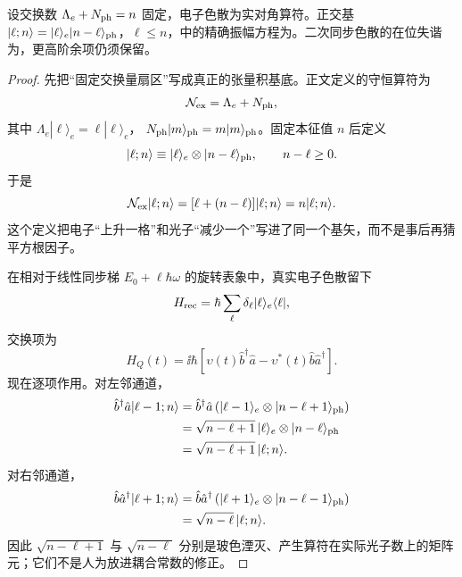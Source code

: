 \begin{proposition}[交换守恒扇区中的反冲格]
设交换数 $\Lambda_e+N_{\rm ph}=n$ 固定，电子色散为实对角算符。正交基 $|\ell;n\rangle=|\ell\rangle_e|n-\ell\rangle_{\rm ph}$，$\ell\le n$，中的精确振幅方程为。二次同步色散的在位失谐为，更高阶余项仍须保留。
\end{proposition}
\begin{proof}
先把“固定交换量扇区”写成真正的张量积基底。正文定义的守恒算符为
\begin{equation*}
\mathcal N_{\rm ex}=\Lambda_e+N_{\rm ph},
\end{equation*}
其中 \(\Lambda_e|\ell\rangle_e=\ell|\ell\rangle_e\)，
\(N_{\rm ph}|m\rangle_{\rm ph}=m|m\rangle_{\rm ph}\)。固定本征值 \(n\) 后定义
\begin{equation*}
|\ell;n\rangle
\equiv
|\ell\rangle_e\otimes|n-\ell\rangle_{\rm ph},
\qquad n-\ell\ge0.
\end{equation*}
于是
\begin{equation*}
\mathcal N_{\rm ex}|\ell;n\rangle
=[\ell+(n-\ell)]|\ell;n\rangle
=n|\ell;n\rangle.
\end{equation*}
这个定义把电子“上升一格”和光子“减少一个”写进了同一个基矢，而不是事后再猜平方根因子。

在相对于线性同步梯 \(E_0+\ell\hbar\omega\) 的旋转表象中，真实电子色散留下
\begin{equation*}
H_{\rm rec}
=\hbar\sum_\ell\delta_\ell|\ell\rangle_e\langle\ell|,
\end{equation*}
交换项为
\begin{equation*}
H_Q(t)
=\ii\hbar\left[
\upsilon(t)\hat b^\dagger\hat a
-\upsilon^*(t)\hat b\hat a^\dagger
\right].
\end{equation*}
现在逐项作用。对左邻通道，
\begin{align*}
\hat b^\dagger\hat a|\ell-1;n\rangle
&=\hat b^\dagger\hat a
\left(|\ell-1\rangle_e\otimes|n-\ell+1\rangle_{\rm ph}\right)\\
&=\sqrt{n-\ell+1}\,
|\ell\rangle_e\otimes|n-\ell\rangle_{\rm ph}\\
&=\sqrt{n-\ell+1}\,|\ell;n\rangle.
\end{align*}
对右邻通道，
\begin{align*}
\hat b\hat a^\dagger|\ell+1;n\rangle
&=\hat b\hat a^\dagger
\left(|\ell+1\rangle_e\otimes|n-\ell-1\rangle_{\rm ph}\right)\\
&=\sqrt{n-\ell}\,|\ell;n\rangle.
\end{align*}
因此 \(\sqrt{n-\ell+1}\) 与 \(\sqrt{n-\ell}\) 分别是玻色湮灭、产生算符在实际光子数上的矩阵元；它们不是人为放进耦合常数的修正。


\end{proof}

